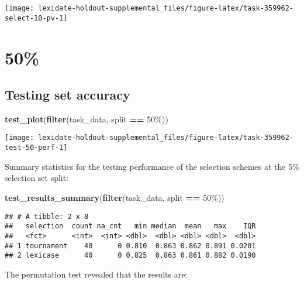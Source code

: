 \documentclass[
]{book}
\newenvironment{Shaded}{\begin{snugshade}}{\end{snugshade}}
\newcommand{\FunctionTok}[1]{\textcolor[rgb]{0.13,0.29,0.53}{\textbf{#1}}}
\newcommand{\NormalTok}[1]{#1}
\newcommand{\SpecialCharTok}[1]{\textcolor[rgb]{0.81,0.36,0.00}{\textbf{#1}}}
\newcommand{\StringTok}[1]{\textcolor[rgb]{0.31,0.60,0.02}{#1}}
\begin{document}
\texttt{[image: lexidate-holdout-supplemental\_files/figure-latex/task-359962-select-10-pv-1]}

\hypertarget{section-57}{%
\section{50\%}\label{section-57}}

\hypertarget{testing-set-accuracy-57}{%
\subsection{Testing set accuracy}\label{testing-set-accuracy-57}}

\begin{Shaded}
\begin{Highlighting}[]
\FunctionTok{test\_plot}\NormalTok{(}\FunctionTok{filter}\NormalTok{(task\_data, split }\SpecialCharTok{==} \StringTok{\textquotesingle{}50\%\textquotesingle{}}\NormalTok{))}
\end{Highlighting}
\end{Shaded}

\texttt{[image: lexidate-holdout-supplemental\_files/figure-latex/task-359962-test-50-perf-1]}

Summary statistics for the testing performance of the selection schemes at the 5\% selection set split:

\begin{Shaded}
\begin{Highlighting}[]
\FunctionTok{test\_results\_summary}\NormalTok{(}\FunctionTok{filter}\NormalTok{(task\_data, split }\SpecialCharTok{==} \StringTok{\textquotesingle{}50\%\textquotesingle{}}\NormalTok{))}
\end{Highlighting}
\end{Shaded}

\begin{verbatim}
## # A tibble: 2 x 8
##   selection  count na_cnt   min median  mean   max    IQR
##   <fct>      <int>  <int> <dbl>  <dbl> <dbl> <dbl>  <dbl>
## 1 tournament    40      0 0.810  0.863 0.862 0.891 0.0201
## 2 lexicase      40      0 0.825  0.863 0.861 0.882 0.0190
\end{verbatim}

The permutation test revealed that the results are:
\end{document}
